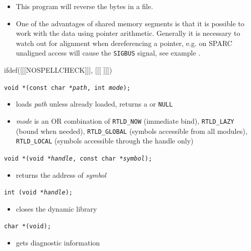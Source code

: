 \begin{itemize}
\item This program will reverse the bytes in a file.
\item One of the advantages of shared memory segments is that it is possible
to work with the data using pointer arithmetic. Generally it is necessary
to watch out for alignment when dereferencing a pointer, e.g. on SPARC 
unaligned access will cause the \texttt{SIGBUS} signal, see example
.
\end{itemize}


ifdef([[[NOSPELLCHECK]]], [[[
]]])

\begin{slide}
\texttt{void *(const char *\emph{path}, int \emph{mode});} 
\begin{itemize}
\item loads \emph{path} unless already loaded, returns
a  or \texttt{NULL}
\item \emph{mode} is an OR combination of \texttt{RTLD\_NOW} (immediate
bind), \texttt{RTLD\_LAZY} (bound when needed), \texttt{RTLD\_GLOBAL}
(symbols accessible from all modules), \texttt{RTLD\_LOCAL} (symbols accessible
through the handle only)
\end{itemize}
\texttt{void *(void *\emph{handle}, const char *\emph{symbol});}
\begin{itemize}
\item returns the address of \emph{symbol}
\end{itemize}
\texttt{int (void *\emph{handle});}
\begin{itemize}
\item closes the dynamic library
\end{itemize}
\texttt{char *(void);}
\begin{itemize}
\item gets diagnostic information
\end{itemize}
\end{slide}

\label{DLOPEN}

